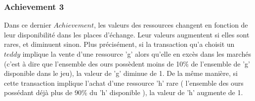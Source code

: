 \documentclass{article}
\begin{document}
\subsubsection{Achievement 3}
Dans ce dernier $Achievement$, les valeurs des ressources changent en fonction de leur disponibilité dans les places d'échange. Leur valeurs augmentent si elles sont rares, et diminuent sinon. Plus précisément, si la transaction qu'a choisit un $teddy$ implique la vente d'une ressource 'g' alors qu'elle en excès dans les marchés (c'est à dire que l'ensemble des ours possèdent moins de 10\% de l'ensemble de 'g' disponible dans le jeu), la valeur de 'g' diminue de 1. De la même manière, si cette transaction implique l'achat d'une ressource 'h' rare ( l'ensemble des ours possédant déjà plus de 90\% du 'h' disponible ), la valeur de 'h' augmente de 1. \\
\end{document}
